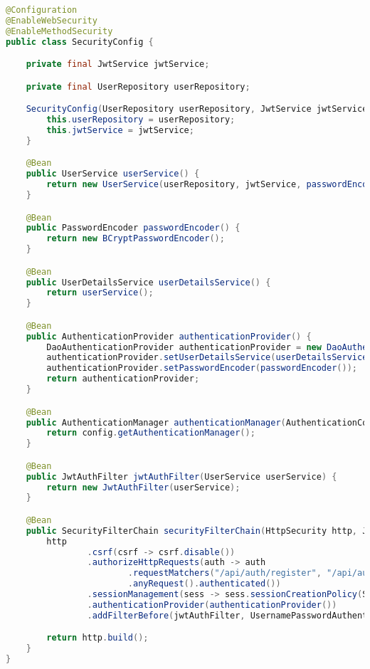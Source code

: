 \begin{lstlisting}[language=Java]
@Configuration
@EnableWebSecurity
@EnableMethodSecurity
public class SecurityConfig {

    private final JwtService jwtService;

    private final UserRepository userRepository;

    SecurityConfig(UserRepository userRepository, JwtService jwtService) {
        this.userRepository = userRepository;
        this.jwtService = jwtService;
    }

    @Bean
    public UserService userService() {
        return new UserService(userRepository, jwtService, passwordEncoder());
    }

    @Bean
    public PasswordEncoder passwordEncoder() {
        return new BCryptPasswordEncoder();
    }

    @Bean
    public UserDetailsService userDetailsService() {
        return userService();
    }

    @Bean
    public AuthenticationProvider authenticationProvider() {
        DaoAuthenticationProvider authenticationProvider = new DaoAuthenticationProvider();
        authenticationProvider.setUserDetailsService(userDetailsService());
        authenticationProvider.setPasswordEncoder(passwordEncoder());
        return authenticationProvider;
    }

    @Bean
    public AuthenticationManager authenticationManager(AuthenticationConfiguration config) throws Exception {
        return config.getAuthenticationManager();
    }

    @Bean
    public JwtAuthFilter jwtAuthFilter(UserService userService) {
        return new JwtAuthFilter(userService);
    }

    @Bean
    public SecurityFilterChain securityFilterChain(HttpSecurity http, JwtAuthFilter jwtAuthFilter) throws Exception {
        http
                .csrf(csrf -> csrf.disable())
                .authorizeHttpRequests(auth -> auth
                        .requestMatchers("/api/auth/register", "/api/auth/login", "/static/**", "/{name:^(?!api).+}/**", "/").permitAll()
                        .anyRequest().authenticated())
                .sessionManagement(sess -> sess.sessionCreationPolicy(SessionCreationPolicy.STATELESS))
                .authenticationProvider(authenticationProvider())
                .addFilterBefore(jwtAuthFilter, UsernamePasswordAuthenticationFilter.class);

        return http.build();
    }
}
\end{lstlisting}

